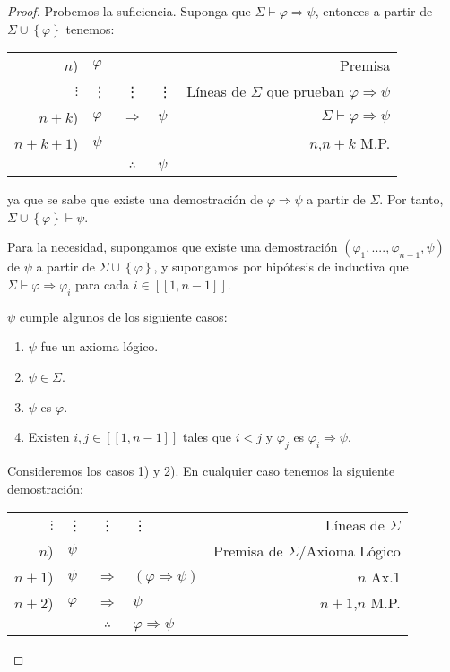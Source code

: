 \documentclass[12pt]{report}
\newcounter{it}
\theoremstyle{largebreak}
\newcommand\natint[1]{\ensuremath{\left[\!\left[ #1\right]\!\right]}}
\begin{document}
    \begin{proof}
        Probemos la suficiencia. Suponga que $\Sigma\vdash\varphi\Rightarrow\psi$, entonces a partir de $\Sigma\cup\left\{\varphi\right\}$ tenemos:
        \begin{center}
            \begin{tabular}{r l c l r}
                $n$) & $\varphi$ &  &  & Premisa \\
                $\vdots$ & \vdots & \vdots & \vdots & Líneas de $\Sigma$ que prueban $\varphi\Rightarrow\psi$ \\
                $n+k$) & $\varphi$ & $\Rightarrow$ & $\psi$ & $\Sigma\vdash\varphi\Rightarrow\psi$ \\
                $n+k+1$) & $\psi$ &  &  & $n$,$n+k$ M.P. \\
                \hline
                & & $\therefore$ & $\psi$ & \\
            \end{tabular}
        \end{center}
        ya que se sabe que existe una demostración de $\varphi\Rightarrow\psi$ a partir de $\Sigma$. Por tanto, $\Sigma\cup\left\{\varphi \right\}\vdash\psi$.

        Para la necesidad, supongamos que existe una demostración $(\varphi_1,....,\varphi_{n-1},\psi)$ de $\psi$ a partir de $\Sigma\cup\left\{\varphi\right\}$, y supongamos por hipótesis de inductiva que $\Sigma\vdash\varphi\Rightarrow\varphi_i$ para cada $i\in\natint{1,n-1}$.

        $\psi$ cumple algunos de los siguiente casos:
        \begin{enumerate}
            \item $\psi$ fue un axioma lógico.
            \item $\psi\in\Sigma$.
            \item $\psi$ es $\varphi$.
            \item Existen $i,j\in\natint{1,n-1}$ tales que $i<j$ y $\varphi_j$ es $\varphi_i\Rightarrow\psi$.
        \end{enumerate}

        Consideremos los casos 1) y 2). En cualquier caso tenemos la siguiente demostración:
        \begin{center}
            \begin{tabular}{r l c l r}
                $\vdots$ & \vdots & \vdots & \vdots & Líneas de $\Sigma$ \\
                $n$) & $\psi$ &  &  & Premisa de $\Sigma$/Axioma Lógico \\
                $n+1$) & $\psi$ & $\Rightarrow$ & $(\varphi\Rightarrow\psi)$ & $n$ Ax.1 \\
                $n+2$) & $\varphi$ & $\Rightarrow$ & $\psi$ & $n+1$,$n$ M.P. \\
                \hline
                & & $\therefore$ & $\varphi\Rightarrow\psi$ & \\
            \end{tabular}
        \end{center}


\end{proof}
\end{document}
